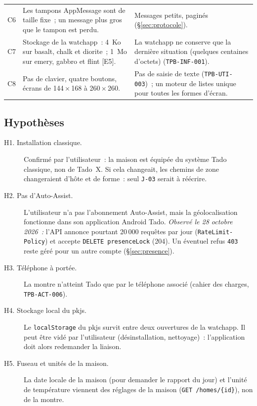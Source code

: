 {\begin{longtable}{@{}l>{\raggedright\arraybackslash}p{70mm}>{\raggedright\arraybackslash}p{72mm}@{}}
    C6 & Les tampons AppMessage sont de taille fixe~; un message plus gros que le tampon est perdu. & Messages petits, paginés (§\ref{sec:protocole}). \\
    C7 & Stockage de la watchapp~: 4~Ko sur basalt, chalk et diorite~; 1~Mo sur emery, gabbro et flint [E5]. & La watchapp ne conserve que la dernière situation (quelques centaines d'octets) (\texttt{TPB-INF-001}). \\
    C8 & Pas de clavier, quatre boutons, écrans de 144\,×\,168 à 260\,×\,260. & Pas de saisie de texte (\texttt{TPB-UTI-003})~; un moteur de listes unique pour toutes les formes d'écran. \\
\end{longtable}}

\subsection{Hypothèses}
\label{sec:hypotheses}

\begin{description}
  \item[H1. Installation classique.] Confirmé par l'utilisateur~: la maison est équipée du
    système Tado classique, non de Tado~X. Si cela changeait, les chemins de zone changeraient
    d'hôte et de forme~: seul \texttt{J-03} serait à réécrire.
  \item[H2. Pas d'Auto-Assist.] L'utilisateur n'a pas l'abonnement Auto-Assist, mais la
  géolocalisation fonctionne dans son application Android Tado. \emph{Observé le 28 octobre 2026~:}
  l'API annonce pourtant 20\,000 requêtes par jour (\texttt{RateLimit-Policy}) et accepte
  \texttt{DELETE presenceLock} (204). Un éventuel refus \texttt{403} reste géré
  pour un autre compte (§\ref{sec:presence}).
  \item[H3. Téléphone à portée.] La montre n'atteint Tado que par le téléphone associé
    (cahier des charges, \texttt{TPB-ACT-006}).
  \item[H4. Stockage local du pkjs.] Le \texttt{localStorage} du pkjs survit entre deux
    ouvertures de la watchapp. Il peut être vidé par l'utilisateur (désinstallation, nettoyage)~:
    l'application doit alors redemander la liaison.
  \item[H5. Fuseau et unités de la maison.] La date locale de la maison (pour demander le
    rapport du jour) et l'unité de température viennent des réglages de la maison
    (\texttt{GET /homes/\{id\}}), non de la montre.
\end{description}

